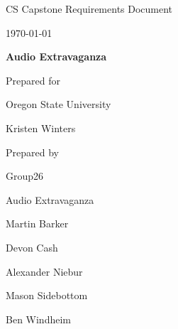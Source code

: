 \documentclass[onecolumn, draftclsnofoot,10pt, compsoc]{IEEEtran}
\def \CapstoneTeamName{Audio Extravaganza}
\def \CapstoneTeamNumber{26}
\def \GroupMemberOne{Martin Barker}
\def \GroupMemberTwo{Devon Cash}
\def \GroupMemberThree{Alexander Niebur}
\def \GroupMemberFour{Mason Sidebottom}
\def \GroupMemberFive{Ben Windheim}
\def \CapstoneProjectName{Audio Extravaganza}
\def \CapstoneSponsorCompany{Oregon State University}
\def \CapstoneSponsorPerson{Kristen Winters}
\def \DocType{		
				Requirements Document
				}
\newcommand{\NameSigPair}[1]{\par
\makebox[2.75in][r]{#1} \hfil 	\makebox[3.25in]{\makebox[2.25in]{\hrulefill} \hfill		\makebox[.75in]{\hrulefill}}
\par\vspace{-12pt} \textit{\tiny\noindent
\makebox[2.75in]{} \hfil		\makebox[3.25in]{\makebox[2.25in][r]{Signature} \hfill	\makebox[.75in][r]{Date}}}}
\renewcommand{\NameSigPair}[1]{#1}
\begin{document}
\begin{titlepage}
    \begin{singlespace}
        \hfill  
        \par\vspace{.2in}
        \centering
        \scshape{
            \huge CS Capstone \DocType \par
            {\large\today}\par
            \vspace{.5in}
            \textbf{\Huge\CapstoneProjectName}\par
            \vfill
            {\large Prepared for}\par
            \Huge \CapstoneSponsorCompany\par
            \vspace{5pt}
            {\Large\NameSigPair{\CapstoneSponsorPerson}\par}
            {\large Prepared by }\par
            Group\CapstoneTeamNumber\par
            \CapstoneTeamName\par 
            \vspace{5pt}
            {\Large
                \NameSigPair{\GroupMemberOne}\par
                \NameSigPair{\GroupMemberTwo}\par
                \NameSigPair{\GroupMemberThree}\par
                \NameSigPair{\GroupMemberFour}\par
                \NameSigPair{\GroupMemberFive}\par
            }
            \vspace{20pt}
        }

		
    \end{singlespace}
\end{titlepage}
\newpage
{}
\tableofcontents

\clearpage
\end{document}
